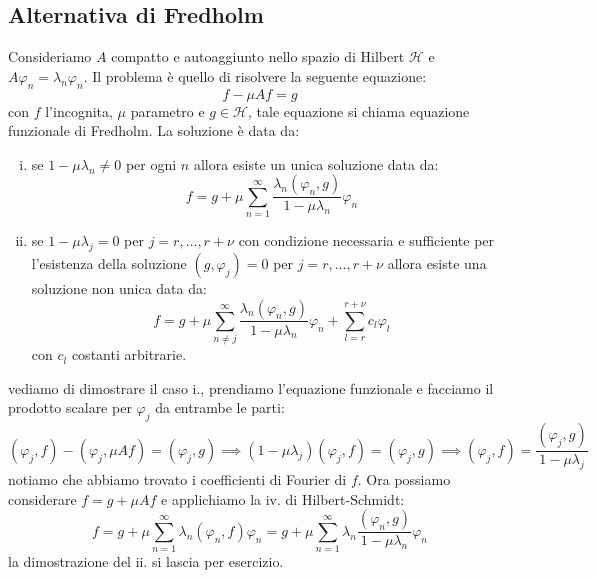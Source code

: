 \documentclass[12pt]{book}
\theoremstyle{plain}
\renewcommand{\H}{\mathcal{H}}
\theoremstyle{definition}
\theoremstyle{remark}
\begin{document}
\subsection{Alternativa di Fredholm}
Consideriamo $A$ compatto e autoaggiunto nello spazio di Hilbert $\H$ e $A\varphi_n = \lambda_n\varphi_n$. Il problema è quello di risolvere la seguente equazione:
\[f-\mu Af=g\]
con $f$ l'incognita, $\mu$ parametro e $g\in\H$, tale equazione si chiama equazione funzionale di Fredholm. La soluzione è data da:
\begin{enumerate}[i.]
\item se $1-\mu \lambda_n\neq 0$ per ogni $n$ allora esiste un unica soluzione data da:
\[f = g + \mu \sum_{n=1}^\infty \frac{\lambda_n(\varphi_n,g)}{1-\mu\lambda_n}\varphi_n\]
\item  se $1-\mu \lambda_j =  0$ per $j = r,\dots,r+\nu$ con condizione necessaria e sufficiente per l'esistenza della soluzione $(g,\varphi_j) = 0$ per $j = r,\dots,r+\nu$ allora esiste una soluzione non unica data da:
\[f = g+ \mu \sum_{n\neq j}^\infty \frac{\lambda_n(\varphi_n,g)}{1-\mu\lambda_n}\varphi_n  + \sum_{l=r}^{r+\nu} c_l \varphi_l\]
con $c_l$ costanti arbitrarie.
\end{enumerate}
vediamo di dimostrare il caso i., prendiamo l'equazione funzionale e facciamo il prodotto scalare per $\varphi_j$ da entrambe le parti:
\[(\varphi_j,f) - (\varphi_j,\mu Af) = (\varphi_j,g) \implies (1-\mu \lambda_j)(\varphi_j,f) = (\varphi_j,g) \implies (\varphi_j,f) = \frac{(\varphi_j,g)}{1-\mu \lambda_j} \]
notiamo che abbiamo trovato i coefficienti di Fourier di $f$. Ora possiamo considerare $f = g+ \mu Af$ e applichiamo la iv. di Hilbert-Schmidt:
\[f = g + \mu \sum_{n=1}^\infty\lambda_n(\varphi_n,f)\varphi_n = g + \mu \sum_{n=1}^\infty\lambda_n\frac{(\varphi_n,g)}{1-\mu \lambda_n}\varphi_n \]
la dimostrazione del ii. si lascia per esercizio.
\end{document}
